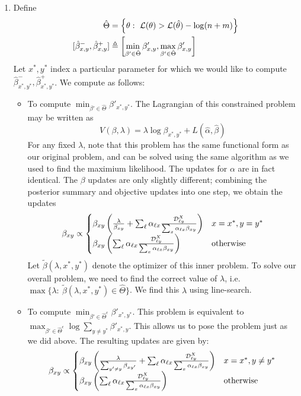 \documentclass{article}
\theoremstyle{definition}
\begin{document}
\begin{enumerate}
    \item Define 
    \begin{align*}
    \hat \Theta &= \left\{\theta:\ \mathcal{L}(\theta) > \mathcal{L}(\hat \theta) - \log(n+m)\right\}\\
    [\hat \beta^-_{x,y},\hat \beta^+_{x,y}] &\triangleq \left[\min_{\beta' \in \hat \Theta} \beta'_{x,y},\max_{\beta' \in \hat \Theta}\beta'_{x,y}\right]
    \end{align*}
    Let $x^*,y^*$ index a particular parameter for which we would like to compute $\hat \beta^-_{x^*,y^*},\hat \beta^+_{x^*,y^*}$.  We compute as follows:
    \begin{itemize}
        \item To compute $\min_{\beta' \in \hat \Theta} \beta'_{x^*,y^*}$.  The Lagrangian of this constrained problem may be written as
        \[
        V(\beta,\lambda) = \lambda \log \beta_{x^*,y^*} + L(\hat \alpha,\hat \beta)
        \]
        For any fixed $\lambda$, note that this problem has the same functional form as our original problem, and can be solved using the same algorithm as we used to find the maximium likelihood.  The updates for $\alpha$ are in fact identical.  The $\beta$ updates are only slightly different; combining the posterior summary and objective updates into one step, we obtain the updates
        \[
        \beta_{xy} \propto 
            \begin{cases} 
            {\beta}_{xy}\left(\frac{\lambda}{\beta_{xy}}  + \sum_{\ell}\alpha_{\ell x}\frac{\mathcal{D}^X_{\ell y}}{\sum_{x}\alpha_{\ell x}{\beta}_{xy}}\right) & x=x^*,y=y^*\\
            {\beta}_{xy}\left(\sum_{\ell}\alpha_{\ell x}\frac{\mathcal{D}^X_{\ell y}}{\sum_{x}\alpha_{\ell x}{\beta}_{xy}}\right) & \mathrm{otherwise}\\
            \end{cases}
        \]
        Let $\tilde \beta(\lambda,x^*,y^*)$ denote the optimizer of this inner problem.  To solve our overall problem, we need to find the correct value of $\lambda$, i.e. $\max \{\lambda:\ \tilde \beta(\lambda,x^*,y^*) \in \hat \Theta\}$.  We find this $\lambda$ using line-search.
        
        \item To compute $\min_{\beta' \in \hat \Theta^\epsilon} \beta'_{x^*,y^*}$.  This problem is equivalent to $\max_{\beta' \in \hat \Theta^\epsilon} \log \sum_{y\neq y^*} \beta'_{x^*,y}$.  This allows us to pose the problem just as we did above.  The resulting updates are given by:
        \[
        \beta_{xy} \propto 
            \begin{cases} 
            {\beta}_{xy}\left(\frac{\lambda}{\sum_{y'\neq y} \beta_{xy'}}  + \sum_{\ell}\alpha_{\ell x}\frac{\mathcal{D}^X_{\ell y}}{\sum_{x}\alpha_{\ell x}{\beta}_{xy}}\right) & x=x^*,y\neq y^*\\
            {\beta}_{xy}\left(\sum_{\ell}\alpha_{\ell x}\frac{\mathcal{D}^X_{\ell y}}{\sum_{x}\alpha_{\ell x}{\beta}_{xy}}\right) & \mathrm{otherwise}\\
            \end{cases}
        \]
    \end{itemize} 


\end{enumerate}
\end{document}
